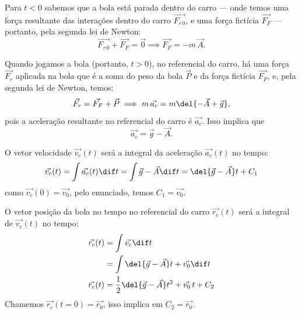 \documentclass[]{IMTexam}
\begin{document}
\begin{questions}
\begin{solution}
\begin{multi}

			\nextcol
			\centering
		\end{multi}



		Para $ t<0 $ sabemos que a bola está parada dentro do carro --- onde temos uma força resultante das interações dentro do carro $ \vec{F_{r\,0}} $, e uma força fictícia $ \vec{F_F} $ --- portanto, pela segunda lei de Newton:
		\[ \vec{F_{r\,0}}+\vec{F_F}=\vec{0}\implies \vec{F_F}=-m\,\vec{A}. \]

		Quando jogamos a bola (portanto, $ t>0 $), no referencial do carro, há uma força $ \vec{F_r} $ aplicada na bola que é a soma do peso da bola $ \vec{P} $ e da força fictícia $ \vec{F_F} $, e, pela segunda lei de Newton, temos:
		\[ \vec{F_r}=\vec{F_F}+\vec{P}\implies m\,\vec{a_c}=m\del{-\vec{A}+\vec{g}}, \]
		pois a aceleração resultante no referencial do carro é $\vec{a_c}$. Isso implica que \[ \vec{a_c}=\vec{g}-\vec{A}. \]


		O vetor velocidade $ \vec{v_c}(t) $ será a integral da aceleração $\vec{a_c}(t)$ no tempo:
		\[ \vec{v_c}(t)=\int \vec{a_c}(t)\dif t=\int \vec{g}-\vec{A}\dif t=\del{\vec{g}-\vec{A}}t+C_1 \]
		como $ \vec{v_c}(0)=\vec{v_0} $, pelo enunciado, temos $ C_1=\vec{v_0} $.

		O vetor posição da bola no tempo no referencial do carro $ \vec{r_c}(t) $ será a integral de $ \vec{v_c}(t) $ no tempo:
		\begin{align*}
			\vec{r_c}(t) & =\int \vec{v_c}\dif t                                    \\
			             & =\int \del{\vec{g}-\vec{A}}t+\vec{v_0} \dif t            \\
			\vec{r_c}(t) & =\dfrac{1}{2}\del{\vec{g}-\vec{A}}t^{2}+\vec{v_0}\,t+C_2
		\end{align*}
		Chamemos $\vec{r_c}(t=0)=\vec{r_0}$, isso implica em $ C_2=\vec{r_0} $.


\end{solution}
\end{questions}
\end{document}
